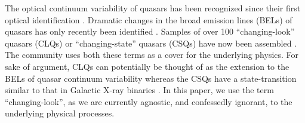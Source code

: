 \documentclass[fleqn,usenatbib]{mnras}
\begin{document}
The optical continuum variability of quasars has been recognized since
their first optical identification
\citep[e.g.,][]{MatthewsSandage1963}.
Dramatic changes
in the broad emission lines (BELs) of quasars has only recently been
identified \citep[e.g., ][]{LaMassa2015}.  Samples of over 100
``changing-look'' quasars (CLQs) or ``changing-state'' quasars (CSQs)
have now been assembled \citep[e.g.,][]{MacLeod2019, Graham2019b}. The
community uses both these terms as a cover for the underlying
physics. For sake of argument, CLQs can potentially be thought of as
the extension to the BELs of quasar continuum variability \citep[e.g.,
][]{MacLeod2012} whereas the CSQs have a state-transition similar to
that in Galactic X-ray binaries \citep[][]{NodaDone2018, Ruan2019a}. In
this paper, we use the term ``changing-look'', as we are currently
agnostic, and confessedly ignorant, to the underlying physical
processes.
\end{document}
